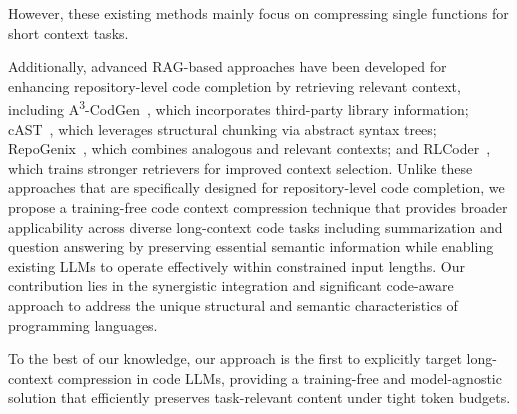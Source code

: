 \documentclass[10pt,conference]{IEEEtran}
\newcommand{\edit}[1]{{\color{black}#1}}
\newcommand{\todoc}[2]{{\textcolor{#1}{\textbf{[#2]}}}}
\newcommand{\shi}[1]{\todoc{orange}{Shi: #1}}
\begin{document}
\edit{However, these existing methods mainly focus on compressing single functions for short context tasks.

Additionally, advanced RAG-based approaches have been developed for enhancing repository-level code completion by retrieving relevant context, including A\textsuperscript{3}-CodGen~\cite{liao2024a3codgen}, which incorporates third-party library information; cAST~\cite{zhang2025cast}, which leverages structural chunking via abstract syntax trees; RepoGenix~\cite{liang2024repogenix}, which combines analogous and relevant contexts; and RLCoder~\cite{wang2024rlcoder}, which trains stronger retrievers for improved context selection. Unlike these approaches that are specifically designed for repository-level code completion, we propose a training-free code context compression technique that provides broader applicability across diverse long-context code tasks including summarization and question answering by preserving essential semantic information while enabling existing LLMs to operate effectively within constrained input lengths. Our contribution lies in the synergistic integration and significant code-aware approach to address the unique structural and semantic characteristics of programming languages. 

To the best of our knowledge, our approach is the first to explicitly target long-context compression in code LLMs, providing a training-free and model-agnostic solution that efficiently preserves task-relevant content under tight token budgets.}
\end{document}
